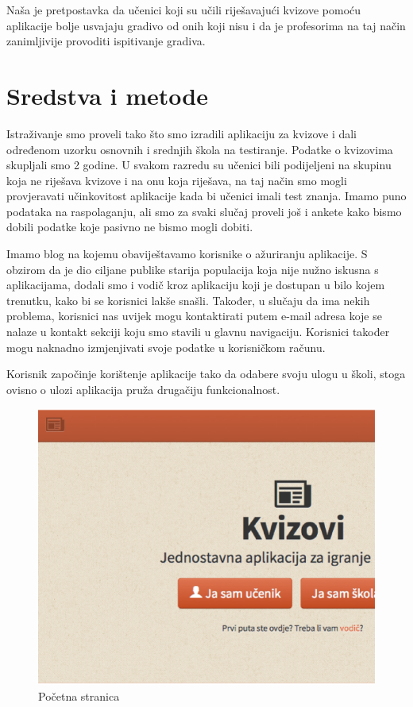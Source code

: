 \documentclass{scrreprt}
\begin{document}
Naša je pretpostavka da učenici koji su učili riješavajući kvizove pomoću
aplikacije bolje usvajaju gradivo od onih koji nisu i da je profesorima na taj
način zanimljivije provoditi ispitivanje gradiva.

\chapter{Sredstva i metode}

Istraživanje smo proveli tako što smo izradili aplikaciju za kvizove i dali
određenom uzorku osnovnih i srednjih škola na testiranje. Podatke o kvizovima
skupljali smo 2 godine. U svakom razredu su učenici bili podijeljeni na skupinu
koja ne riješava kvizove i na onu koja riješava, na taj način smo mogli
provjeravati učinkovitost aplikacije kada bi učenici imali test znanja. Imamo
puno podataka na raspolaganju, ali smo za svaki slučaj proveli još i ankete kako
bismo dobili podatke koje pasivno ne bismo mogli dobiti.

Imamo blog na kojemu obaviještavamo korisnike o ažuriranju aplikacije. S obzirom
da je dio ciljane publike starija populacija koja nije nužno iskusna s
aplikacijama, dodali smo i vodič kroz aplikaciju koji je dostupan u bilo kojem
trenutku, kako bi se korisnici lakše snašli. Također, u slučaju da ima nekih
problema, korisnici nas uvijek mogu kontaktirati putem e-mail adresa koje se
nalaze u kontakt sekciji koju smo stavili u glavnu navigaciju. Korisnici također
mogu naknadno izmjenjivati svoje podatke u korisničkom računu.

Korisnik započinje korištenje aplikacije tako da odabere svoju ulogu u školi,
stoga ovisno o ulozi aplikacija pruža drugačiju funkcionalnost.

\begin{figure}[H]
  \includegraphics[width=\textwidth, clip=true, trim=0 7cm 0 0, fbox]{home}
  \caption{Početna stranica}
\end{figure}
\end{document}
